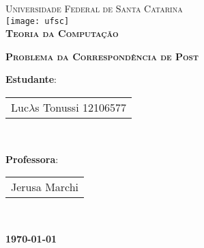 \begin{titlepage}
\begin{center}

\textsc{\large Universidade Federal de Santa Catarina}\\[1cm]

\texttt{[image: ufsc]}\\[1.5cm]

\textsc{\LARGE \bfseries Teoria da Computação \\ [0.8cm]}

\textsc{\LARGE \bfseries Problema da Correspondência de Post \\ [3cm]}


\begin{Large}
\textbf{Estudante}:
\begin{tabular}{|c}
Luc$\lambda$s Tonussi 12106577\\
\end{tabular} \\[0.5cm]
\end{Large}

\vfill

\begin{Large}
\textbf{Professora}:
\begin{tabular}{|c}
Jerusa Marchi \\
\end{tabular} \\[0.5cm]
\end{Large}

\vfill


\textbf{\today}

\end{center}
\end{titlepage}